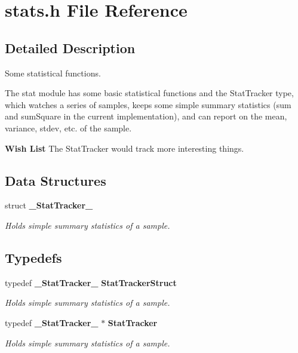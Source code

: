 \section{stats.h File Reference}
\label{stats_8h}


\subsection{Detailed Description}
Some statistical functions. 

The stat module has some basic statistical functions and the Stat\-Tracker type, which watches a series of samples, keeps some simple summary statistics (sum and sum\-Square in the current implementation), and can report on the mean, variance, stdev, etc. of the sample.

\begin{Desc}
\item[{\bf Wish List}]The Stat\-Tracker would track more interesting things. \end{Desc}


\subsection*{Data Structures}
\begin{CompactItemize}
\item 
struct {\bf \_\-Stat\-Tracker\_\-}
\begin{CompactList}\small\item\em Holds simple summary statistics of a sample. \item\end{CompactList}\end{CompactItemize}
\subsection*{Typedefs}
\begin{CompactItemize}
\item 
typedef {\bf \_\-Stat\-Tracker\_\-} {\bf Stat\-Tracker\-Struct}
\begin{CompactList}\small\item\em Holds simple summary statistics of a sample. \item\end{CompactList}\item 
typedef {\bf \_\-Stat\-Tracker\_\-} $\ast$ {\bf Stat\-Tracker}
\begin{CompactList}\small\item\em Holds simple summary statistics of a sample. \item\end{CompactList}\end{CompactItemize}
